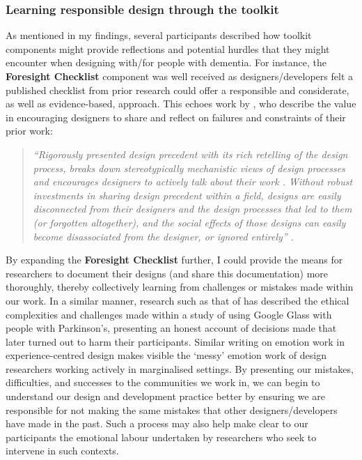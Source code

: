 \subsubsection{Learning responsible design through the toolkit}
As mentioned in my findings, several participants described how toolkit components might provide reflections and potential hurdles that they might encounter when designing with/for people with dementia. For instance, the \textbf{Foresight Checklist} component was well received as designers/developers felt a published checklist from prior research could offer a responsible and considerate, as well as evidence-based, approach. This echoes work by \cite{gray2016inscribing}, who describe the value in encouraging designers to share and reflect on failures and constraints of their prior work:

\begin{quote}
    
\textit{``Rigorously presented design precedent with its rich retelling of the design process, breaks down stereotypically mechanistic views of design processes and encourages designers to actively talk about their work \citep{boling2015designerly,smith2010producing}. Without robust investments in sharing design precedent within a field, designs are easily disconnected from their designers and the design processes that led to them (or forgotten altogether), and the social effects of those designs can easily become disassociated from the designer, or ignored entirely'' \citep[p.993]{gray2016inscribing}}.
\end{quote}

By expanding the \textbf{Foresight Checklist} further, I could provide the means for researchers to document their designs (and share this documentation) more thoroughly, thereby collectively learning from challenges or mistakes made within our work. In a similar manner, research such as that of \cite{vines_our_2017} has described the ethical complexities and challenges made within a study of using Google Glass with people with Parkinson’s, presenting an honest account of decisions made that later turned out to harm their participants. Similar writing on emotion work in experience-centred design \citep{balaam_emotion_2019} makes visible the ‘messy’ emotion work of design researchers working actively in marginalised settings. By presenting our mistakes, difficulties, and successes to the communities we work in, we can begin to understand our design and development practice better by ensuring we are responsible for not making the same mistakes that other designers/developers have made in the past. Such a process may also help make clear to our participants the emotional labour undertaken by researchers who seek to intervene in such contexts.

